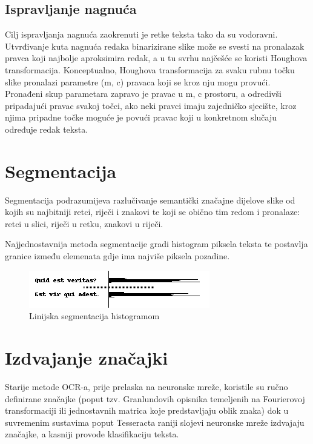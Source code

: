 \documentclass[zavrsnirad]{fer}
\begin{document}
\subsection{Ispravljanje nagnuća}

Cilj ispravljanja nagnuća zaokrenuti je retke teksta tako da su vodoravni. Utvrđivanje kuta nagnuća redaka binarizirane slike može se svesti na pronalazak pravca koji najbolje aproksimira redak, a u tu svrhu najčešće se koristi Houghova transformacija. \cite{Hassanein2015} Konceptualno, Houghova transformacija za svaku rubnu točku slike pronalazi parametre (m, c) pravaca koji se kroz nju mogu provući. Pronađeni skup parametara zapravo je pravac u m, c prostoru, a odredivši pripadajući pravac svakoj točci, ako neki pravci imaju zajedničko sjecište, kroz njima pripadne točke moguće je povući pravac koji u konkretnom slučaju određuje redak teksta.

\section{Segmentacija}

Segmentacija podrazumijeva razlučivanje semantički značajne dijelove slike od kojih su najbitniji retci, riječi i znakovi te koji se obično tim redom i pronalaze: retci u slici, riječi u retku, znakovi u riječi.

Najjednostavnija metoda segmentacije gradi histogram piksela teksta te postavlja granice između elemenata gdje ima najviše piksela pozadine.

\begin{figure}[hbt]
	\centering
	\includegraphics[width=0.9\linewidth]{Figures/line-segmentation.png} 
	\caption{Linijska segmentacija histogramom}
	\label{slk:histogram}
\end{figure}

\section{Izdvajanje značajki}

Starije metode OCR-a, prije prelaska na neuronske mreže, koristile su ručno definirane značajke (poput tzv. Granlundovih opisnika temeljenih na Fourierovoj transformaciji ili jednostavnih matrica koje predstavljaju oblik znaka) \cite{Trier1996} dok u suvremenim sustavima poput Tesseracta raniji slojevi neuronske mreže izdvajaju značajke, a kasniji provode klasifikaciju teksta.
\end{document}
